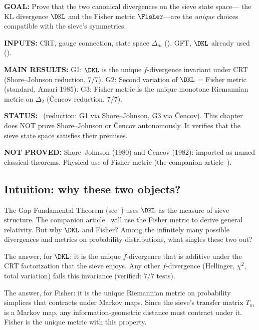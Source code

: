 \documentclass[12pt,a4paper]{article}
\begin{document}
\begin{statusbox}
\textbf{GOAL:}
  Prove that the two canonical divergences on the sieve state space---
  the KL divergence $\DKL$ and the Fisher metric $\Fisher$---are the
  \emph{unique} choices compatible with the sieve's symmetries.

\textbf{INPUTS:}
  CRT, gauge connection, state space $\Delta_m$ (\cite{companion_M1}).
  GFT, $\DKL$ already used (\cite{companion_M1}).

\textbf{MAIN RESULTS:}
  G1: $\DKL$ is the unique $f$-divergence invariant under CRT (Shore--Johnson
  reduction, 7/7).
  G2: Second variation of $\DKL$ = Fisher metric (standard, Amari 1985).
  G3: Fisher metric is the unique monotone Riemannian metric on $\Delta_2$
  (\v Cencov reduction, 7/7).

\textbf{STATUS:}
  \THMTAG~(reduction: G1 via Shore--Johnson, G3 via \v Cencov).
  This chapter does NOT prove Shore--Johnson or \v Cencov autonomously.
  It verifies that the sieve state space satisfies their premises.

\textbf{NOT PROVED:}
  Shore--Johnson (1980) and \v Cencov (1982): imported as named classical
  theorems. Physical use of Fisher metric (the companion article~\cite{companion_physics}).
\end{statusbox}

\subsection{Intuition: why these two objects?}
\label{sec:ch5_intuition}

The Gap Fundamental Theorem (see~\cite{companion_M1}) uses $\DKL$ as the measure of
sieve structure. The companion article~\cite{companion_physics} will use the Fisher metric to derive general
relativity. But why $\DKL$ and Fisher? Among the infinitely many
possible divergences and metrics on probability distributions, what
singles these two out?

The answer, for $\DKL$: it is the unique $f$-divergence that is
additive under the CRT factorization that the sieve enjoys. Any other
$f$-divergence (Hellinger, $\chi^2$, total variation) fails this
invariance (verified: 7/7 tests).

The answer, for Fisher: it is the unique Riemannian metric on probability
simplices that contracts under Markov maps. Since the sieve's transfer
matrix $T_m$ is a Markov map, any information-geometric distance must
contract under it. Fisher is the unique metric with this property.
\end{document}
